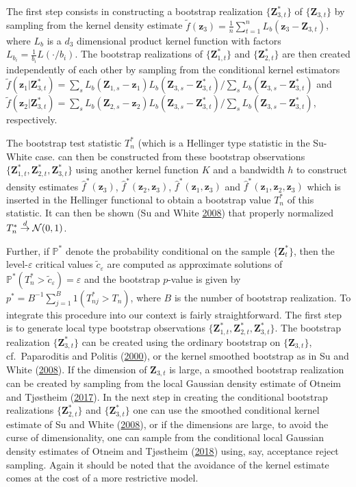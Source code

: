 \documentclass[
  12pt,
  letterpaper]{article}
\numberwithin{equation}{section}
\newcommand{\Z}{\bm{Z}}
\newcommand{\z}{\bm{z}}
\begin{document}
The first step consists in constructing a bootstrap realization \(\{\Z_{3,t}^*\}\) of \(\{\Z_{3,t}\}\) by sampling from the kernel density estimate \(\tilde{f}(\z_{3}) = \frac{1}{n}\sum_{t=1}^{n}L_b(\z_3-\Z_{3,t})\), where \(L_b\) is a \(d_3\) dimensional product kernel function with factors \(L_{b_{i}} = \frac{1}{b_{i}}L(\cdot/b_i)\). The bootstrap realizations of \(\{\Z_{1,t}^*\}\) and \(\{\Z_{2,t}^*\}\) are then created independently of each other by sampling from the conditional kernel estimators \(\tilde{f}(\z_1|\Z_{3,t}^*) = \sum_sL_b(\Z_{1,s}-\z_{1})L_b(\Z_{3,s}-\Z_{3,t}^*)/\sum_s L_b(\Z_{3,s}-\Z_{3,t}^*)\) and \(\tilde{f}(\z_2|\Z_{3,t}^*) = \sum_sL_b(\Z_{2,s}-\z_2)L_b(\Z_{3,s}-\Z_{3,t}^*)/\sum_sL_b(\Z_{3,s}-\Z_{3,t}^*)\), respectively.

The bootstrap test statistic \(T_n^*\) (which is a Hellinger type statistic in the Su-White case. can then be constructed from these bootstrap observations \(\{\Z_{1,t}^*, \Z_{2,t}^*, \Z_{3,t}^*\}\) using another kernel function \(K\) and a bandwidth \(h\) to construct density estimates \(\hat{f}^*(\z_3)\), \(\hat{f}^*(\z_2,\z_3)\), \(\hat{f}^*(\z_1,\z_3)\) and \(\hat{f}^*(\z_1,\z_2,\z_3)\) which is inserted in the Hellinger functional to obtain a bootstrap value \(T_n^*\) of this statistic. It can then be shown (Su and White \protect\hyperlink{ref-su2008nonparametric}{2008}) that properly normalized \(T_n^* \buildrel {d} \over {\to} {\cal N}(0,1)\).

Further, if \(\mathbb{P}^*\) denote the probability conditional on the sample \(\{\Z_t^*\}\), then the level-\(\varepsilon\) critical values \(\tilde{c}_{\varepsilon}\) are computed as approximate solutions of \(\mathbb{P}^{*}(T_n^* > \tilde{c}_{\varepsilon}) = \varepsilon\) and the bootstrap \(p\)-value is given by \(p^* = B^{-1}\sum_{j=1}^{B} 1(T_{nj}^* > T_n)\), where \(B\) is the number of bootstrap realization. To integrate this procedure into our context is fairly straightforward. The first step is to generate local type bootstrap observations \(\{\Z_{1,t}^*,\Z_{2,t}^*,\Z_{3,t}^*\}\). The bootstrap realization \(\{\Z_{3,t}^*\}\) can be created using the ordinary bootstrap on \(\{\Z_{3,t}\}\), cf.~Paparoditis and Politis (\protect\hyperlink{ref-paparoditis2000local}{2000}), or the kernel smoothed bootstrap as in Su and White (\protect\hyperlink{ref-su2008nonparametric}{2008}). If the dimension of \(\Z_{3,t}\) is large, a smoothed bootstrap realization can be created by sampling from the local Gaussian density estimate of Otneim and Tjøstheim (\protect\hyperlink{ref-otneim2017locally}{2017}). In the next step in creating the conditional bootstrap realizations \(\{\Z_{2,t}^*\}\) and \(\{\Z_{3,t}^*\}\) one can use the smoothed conditional kernel estimate of Su and White (\protect\hyperlink{ref-su2008nonparametric}{2008}), or if the dimensions are large, to avoid the curse of dimensionality, one can sample from the conditional local Gaussian density estimates of Otneim and Tjøstheim (\protect\hyperlink{ref-otneim2017conditional}{2018}) using, say, acceptance reject sampling. Again it should be noted that the avoidance of the kernel estimate comes at the cost of a more restrictive model.
\end{document}
